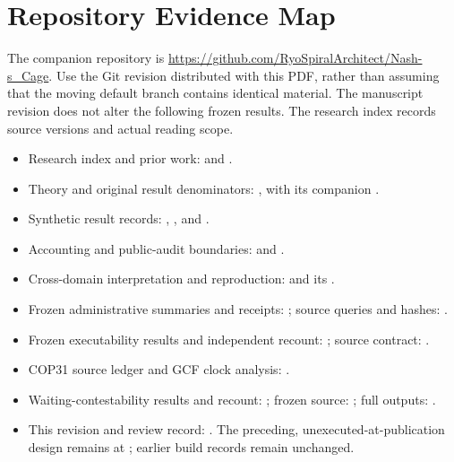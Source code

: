 \documentclass[11pt,a4paper]{article}
\numberwithin{equation}{section}
\theoremstyle{definition}
\theoremstyle{plain}
\theoremstyle{remark}
\begin{document}
\appendix
\section{Repository Evidence Map}
\label{app:evidence}

The companion repository is \url{https://github.com/RyoSpiralArchitect/Nash-s_Cage}.
Use the Git revision distributed with this PDF, rather than assuming that the moving default branch contains identical material. The manuscript revision does not alter the following frozen results. The research index records source versions and actual reading scope.

\begin{itemize}
  \item Research index and prior work:  and .
  \item Theory and original result denominators: , with its companion .
  \item Synthetic result records: , , and .
  \item Accounting and public-audit boundaries:  and .
  \item Cross-domain interpretation and reproduction:  and its .
  \item Frozen administrative summaries and receipts: ; source queries and hashes: .
  \item Frozen executability results and independent recount: ; source contract: .
  \item COP31 source ledger and GCF clock analysis: .
  \item Waiting-contestability results and recount: ; frozen source: ; full outputs: .
  \item This revision and review record: . The preceding, unexecuted-at-publication design remains at ; earlier build records remain unchanged.
\end{itemize}
\end{document}
